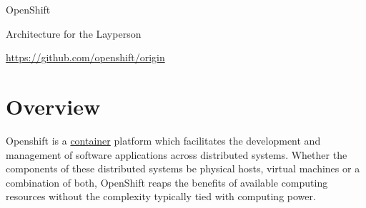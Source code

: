 \documentclass{article}
\begin{document}
\centerline{\sc \large OpenShift}
\centerline{\sc Architecture for the Layperson }
\centerline{\url{https://github.com/openshift/origin}}

\vspace{1pc}

\section{Overview}
\hspace{3pc} Openshift is a \href{https://kyguy.github.io/src/containers/containers.html}{container} platform which facilitates the development and management of software applications across
distributed systems. Whether the components of these distributed systems be physical hosts, virtual machines or a combination of 
both, OpenShift reaps the benefits of available computing resources without the complexity typically tied with computing power. 
\end{document}
